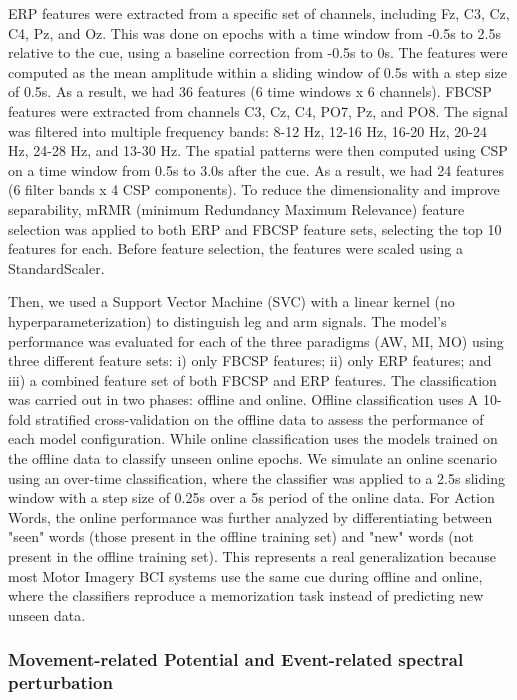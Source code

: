 \documentclass[10pt,letterpaper]{article}
\begin{document}
ERP features were extracted from a specific set of channels, including Fz, C3, Cz, C4, Pz, and Oz. This was done on epochs with a time window from -0.5s to 2.5s relative to the cue, using a baseline correction from -0.5s to 0s. The features were computed as the mean amplitude within a sliding window of 0.5s with a step size of 0.5s. As a result, we had 36 features (6 time windows x 6 channels). FBCSP features were extracted from channels C3, Cz, C4, PO7, Pz, and PO8. The signal was filtered into multiple frequency bands: 8-12 Hz, 12-16 Hz, 16-20 Hz, 20-24 Hz, 24-28 Hz, and 13-30 Hz. The spatial patterns were then computed using CSP on a time window from 0.5s to 3.0s after the cue. As a result, we had 24 features (6 filter bands x 4 CSP components). To reduce the dimensionality and improve separability, mRMR (minimum Redundancy Maximum Relevance) feature selection was applied to both ERP and FBCSP feature sets, selecting the top 10 features for each. Before feature selection, the features were scaled using a StandardScaler.


Then, we used a Support Vector Machine (SVC) with a linear kernel (no hyperparameterization) to distinguish leg and arm signals. The model's performance was evaluated for each of the three paradigms (AW, MI, MO) using three different feature sets: i) only FBCSP features; ii) only ERP features; and iii) a combined feature set of both FBCSP and ERP features. The classification was carried out in two phases: offline and online. Offline classification uses A 10-fold stratified cross-validation on the offline data to assess the performance of each model configuration. While online classification uses the models trained on the offline data to classify unseen online epochs. We simulate an online scenario using an over-time classification, where the classifier was applied to a 2.5s sliding window with a step size of 0.25s over a 5s period of the online data. For Action Words, the online performance was further analyzed by differentiating between "seen" words (those present in the offline training set) and "new" words (not present in the offline training set). This represents a real generalization because most Motor Imagery BCI systems use the same cue during offline and online, where the classifiers reproduce a memorization task instead of predicting new unseen data.

\subsubsection{Movement-related Potential and Event-related spectral perturbation}
\end{document}
